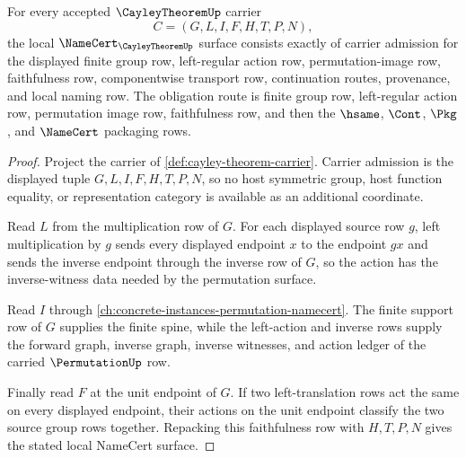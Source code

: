 \begin{theorem}
\label{thm:cayley-theorem-namecert-obligations}
For every accepted $\CayleyTheoremUp$ carrier
$$
C=(G,L,I,F,H,T,P,N),
$$
the local $\NameCert_{\CayleyTheoremUp}$ surface consists exactly of carrier
admission for the displayed finite group row, left-regular action row,
permutation-image row, faithfulness row, componentwise transport row,
continuation routes, provenance, and local naming row. The obligation route is
finite group row, left-regular action row, permutation image row, faithfulness
row, and then the $\hsame$, $\Cont$, $\Pkg$, and $\NameCert$ packaging rows.
\end{theorem}
\begin{proof}
Project the carrier of \autoref{def:cayley-theorem-carrier}. Carrier admission
is the displayed tuple $G,L,I,F,H,T,P,N$, so no host symmetric group, host
function equality, or representation category is available as an additional
coordinate.

Read $L$ from the multiplication row of $G$. For each displayed source row
$g$, left multiplication by $g$ sends every displayed endpoint $x$ to the
endpoint $gx$ and sends the inverse endpoint through the inverse row of $G$,
so the action has the inverse-witness data needed by the permutation surface.

Read $I$ through \autoref{ch:concrete-instances-permutation-namecert}. The
finite support row of $G$ supplies the finite spine, while the left-action and
inverse rows supply the forward graph, inverse graph, inverse witnesses, and
action ledger of the carried $\PermutationUp$ row.

Finally read $F$ at the unit endpoint of $G$. If two left-translation rows act
the same on every displayed endpoint, their actions on the unit endpoint
classify the two source group rows together. Repacking this faithfulness row
with $H,T,P,N$ gives the stated local NameCert surface.
\end{proof}

